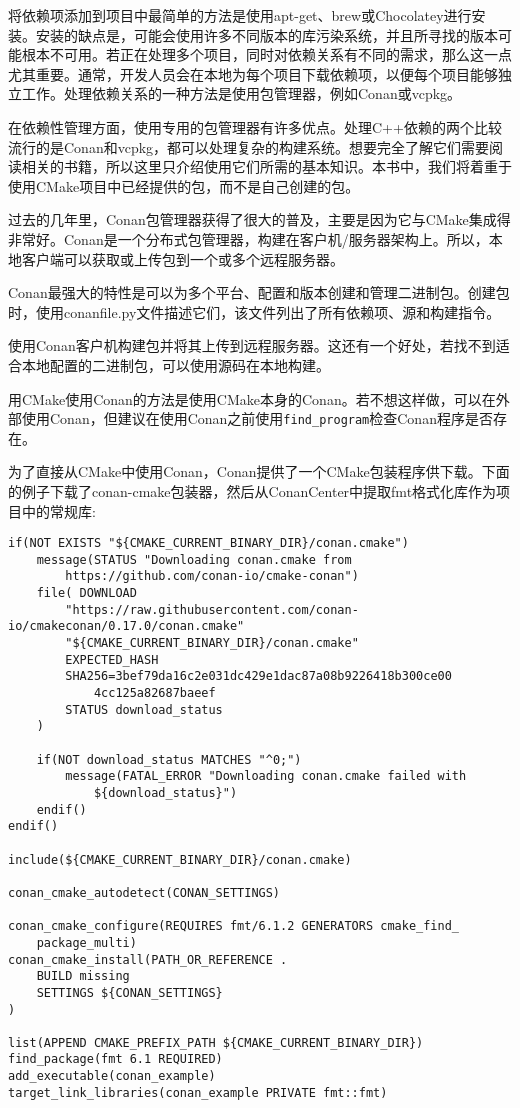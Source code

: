 
将依赖项添加到项目中最简单的方法是使用apt-get、brew或Chocolatey进行安装。安装的缺点是，可能会使用许多不同版本的库污染系统，并且所寻找的版本可能根本不可用。若正在处理多个项目，同时对依赖关系有不同的需求，那么这一点尤其重要。通常，开发人员会在本地为每个项目下载依赖项，以便每个项目能够独立工作。处理依赖关系的一种方法是使用包管理器，例如Conan或vcpkg。

在依赖性管理方面，使用专用的包管理器有许多优点。处理C++依赖的两个比较流行的是Conan和vcpkg，都可以处理复杂的构建系统。想要完全了解它们需要阅读相关的书籍，所以这里只介绍使用它们所需的基本知识。本书中，我们将着重于使用CMake项目中已经提供的包，而不是自己创建的包。


过去的几年里，Conan包管理器获得了很大的普及，主要是因为它与CMake集成得非常好。Conan是一个分布式包管理器，构建在客户机/服务器架构上。所以，本地客户端可以获取或上传包到一个或多个远程服务器。

Conan最强大的特性是可以为多个平台、配置和版本创建和管理二进制包。创建包时，使用conanfile.py文件描述它们，该文件列出了所有依赖项、源和构建指令。

使用Conan客户机构建包并将其上传到远程服务器。这还有一个好处，若找不到适合本地配置的二进制包，可以使用源码在本地构建。

用CMake使用Conan的方法是使用CMake本身的Conan。若不想这样做，可以在外部使用Conan，但建议在使用Conan之前使用\texttt{find\_program}检查Conan程序是否存在。

为了直接从CMake中使用Conan，Conan提供了一个CMake包装程序供下载。下面的例子下载了conan-cmake包装器，然后从ConanCenter中提取fmt格式化库作为项目中的常规库:

\begin{lstlisting}[style=styleCMake]
if(NOT EXISTS "${CMAKE_CURRENT_BINARY_DIR}/conan.cmake")
	message(STATUS "Downloading conan.cmake from
		https://github.com/conan-io/cmake-conan")
	file( DOWNLOAD
		"https://raw.githubusercontent.com/conan-io/cmakeconan/0.17.0/conan.cmake"
		"${CMAKE_CURRENT_BINARY_DIR}/conan.cmake"
		EXPECTED_HASH
		SHA256=3bef79da16c2e031dc429e1dac87a08b9226418b300ce00
			4cc125a82687baeef
		STATUS download_status
	)
	
	if(NOT download_status MATCHES "^0;")
		message(FATAL_ERROR "Downloading conan.cmake failed with
			${download_status}")
	endif()
endif()

include(${CMAKE_CURRENT_BINARY_DIR}/conan.cmake)

conan_cmake_autodetect(CONAN_SETTINGS)

conan_cmake_configure(REQUIRES fmt/6.1.2 GENERATORS cmake_find_
	package_multi)
conan_cmake_install(PATH_OR_REFERENCE .
	BUILD missing
	SETTINGS ${CONAN_SETTINGS}
)

list(APPEND CMAKE_PREFIX_PATH ${CMAKE_CURRENT_BINARY_DIR})
find_package(fmt 6.1 REQUIRED)
add_executable(conan_example)
target_link_libraries(conan_example PRIVATE fmt::fmt)
\end{lstlisting}

